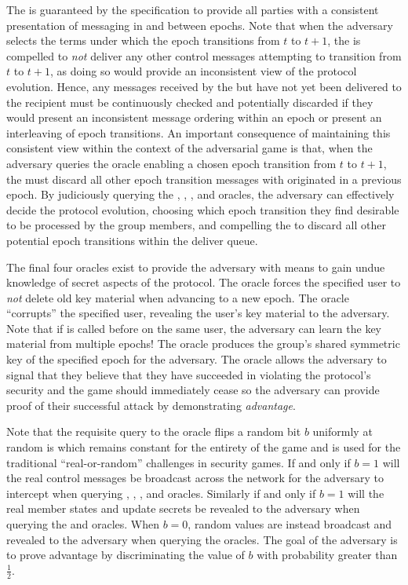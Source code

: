 The  is guaranteed by the  specification to provide all parties with a consistent presentation of messaging in and between epochs.
Note that when the adversary selects the terms under which the epoch transitions from \(t\) to \(t+1\), the  is compelled to \emph{not} deliver any other control messages attempting to transition from \(t\) to \(t+1\), as doing so would provide an inconsistent view of the protocol evolution.
Hence, any messages received by the  but have not yet been delivered to the recipient must be continuously checked and potentially discarded if they would present an inconsistent message ordering within an epoch or present an interleaving of epoch transitions.
An important consequence of maintaining this consistent view within the context of the adversarial  game is that, when the adversary queries the  oracle enabling a chosen epoch transition from \(t\) to \(t+1\), the  must discard all other epoch transition messages with originated in a previous epoch.
By judiciously querying the , , , and  oracles, the adversary can effectively decide the protocol evolution, choosing which epoch transition they find desirable to be processed by the group members, and compelling the  to discard all other potential epoch transitions within the deliver queue.

The final four oracles exist to provide the adversary with means to gain undue knowledge of secret aspects of the  protocol.
The  oracle forces the specified user to \emph{not} delete old key material when advancing to a new epoch.
The  oracle ``corrupts'' the specified user, revealing the user's key material to the adversary. Note that if  is called before  on the same user, the adversary can learn the key material from multiple epochs!
The  oracle produces the group's shared symmetric key of the specified epoch for the adversary.
The  oracle allows the adversary to signal that they believe that they have succeeded in violating the  protocol's security and the game should immediately cease so the adversary can provide proof of their successful attack by demonstrating \emph{advantage}.

Note that the requisite query to the  oracle flips a random bit \(b\) uniformly at random is which remains constant for the entirety of the game and is used for the traditional ``real-or-random'' challenges in security games.
If and only if \(b=1\) will the real control messages be broadcast across the network for the adversary to intercept when querying , , , and  oracles.
Similarly if and only if \(b=1\) will the real member states and update secrets be revealed to the adversary when querying the  and  oracles.
When \(b=0\), random values are instead broadcast and revealed to the adversary when querying the oracles.
The goal of the adversary is to prove advantage by discriminating the value of \(b\) with probability greater than \(\frac{1}{2}\).

